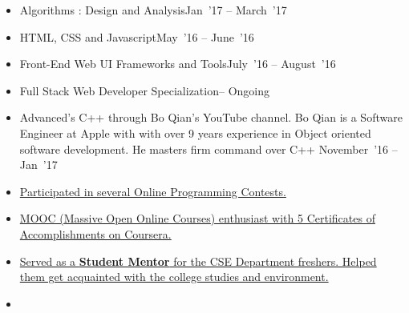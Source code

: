 \documentclass[10pt,a4paper]{article}
\begin{document}
\spacedhrule{0.5em}{-0.4em}

\vspace{0.15cm}
\begin{itemize}[labelindent=1.5em,labelsep=-0.3cm,leftmargin=*]
\item \headedsubsection 
    {Algorithms : Design and Analysis}{{{Jan~'17 -- March~'17}}}
    {}
    
\item \headedsubsection 
    {HTML, CSS and Javascript}{{{May~'16 -- June~'16}}}
    {}
    
\item \headedsubsection 
    {Front-End Web UI Frameworks and Tools}{{{July~'16 -- August~'16}}}
    {}

\item \headedsubsection 
    {Full Stack Web Developer Specialization}{{{-- Ongoing}}}
    {}


\item \headedsubsection  %
  {{\normalfont Advanced's C++ through Bo Qian's YouTube channel. Bo Qian is a Software Engineer at Apple with with over 9 years experience in Object oriented software development. He masters firm command over C++ }}{{{November~'16 -- Jan~'17}}}
  
\end{itemize}


\spacedhrule{0.5em}{-0.4em}

\vspace{0.15cm}
\begin{itemize}[labelindent=1.5em,labelsep=-0.3cm,leftmargin=*]

\item \headedsubsection 
{\href{}{\normalfont Participated in several Online Programming Contests.
}}{{{}}}


\item \headedsubsection 
{\href{}{\normalfont MOOC (Massive Open Online Courses) enthusiast with 5 Certificates of Accomplishments on Coursera.
}}{{{}}}

\item \headedsubsection 
{\href{}{\normalfont Served as a \textbf{Student Mentor} for the CSE Department freshers. Helped them get acquainted
with the college studies and environment.
}}{{{}}}

\item {}

\end{itemize}
\end{document}
